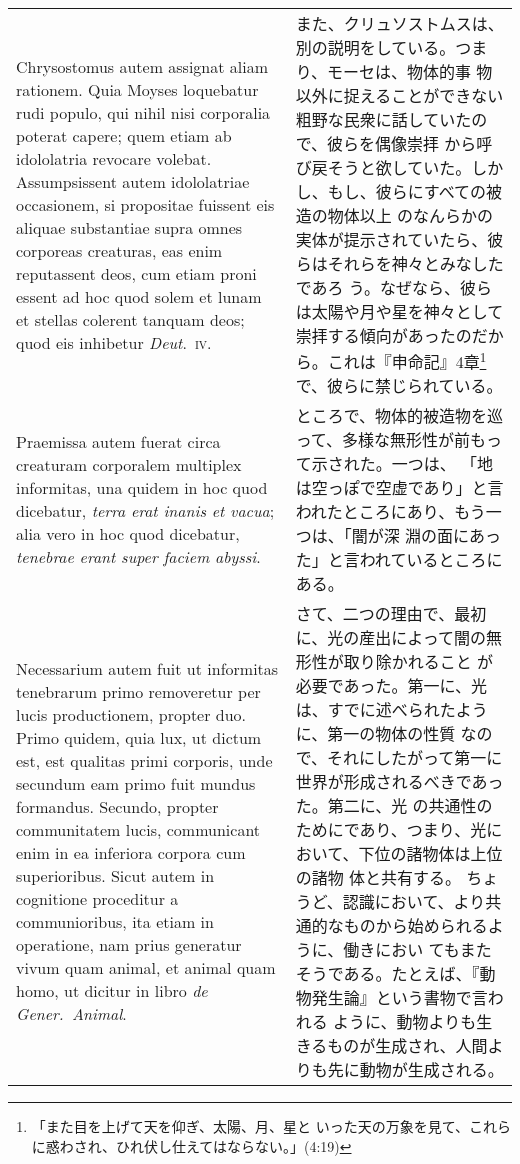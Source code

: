 \documentclass[10pt]{jsarticle} %
\begin{document}
\begin{longtable}{p{21em}p{21em}}
\\


Chrysostomus autem assignat
aliam rationem. Quia Moyses loquebatur rudi populo, qui nihil nisi
corporalia poterat capere; quem etiam ab idololatria revocare
volebat. Assumpsissent autem idololatriae occasionem, si propositae
fuissent eis aliquae substantiae supra omnes corporeas creaturas, eas
enim reputassent deos, cum etiam proni essent ad hoc quod solem et lunam
et stellas colerent tanquam deos; quod eis inhibetur {\itshape Deut}.~{\scshape iv}. 


&


また、クリュソストムスは、別の説明をしている。つまり、モーセは、物体的事
 物以外に捉えることができない粗野な民衆に話していたので、彼らを偶像崇拝
 から呼び戻そうと欲していた。しかし、もし、彼らにすべての被造の物体以上
 のなんらかの実体が提示されていたら、彼らはそれらを神々とみなしたであろ
 う。なぜなら、彼らは太陽や月や星を神々として崇拝する傾向があったのだか
 ら。これは『申命記』4章\footnote{「また目を上げて天を仰ぎ、太陽、月、星と
 いった天の万象を見て、これらに惑わされ、ひれ伏し仕えてはならない。」(4:19)}で、彼らに禁じられている。



\\

Praemissa autem fuerat circa creaturam corporalem multiplex informitas,
una quidem in hoc quod dicebatur, {\itshape terra erat inanis et vacua};
alia vero in hoc quod dicebatur, {\itshape tenebrae erant super faciem
abyssi}. 


&

ところで、物体的被造物を巡って、多様な無形性が前もって示された。一つは、
 「地は空っぽで空虚であり」と言われたところにあり、もう一つは、「闇が深
 淵の面にあった」と言われているところにある。

\\




Necessarium autem fuit ut informitas tenebrarum primo
removeretur per lucis productionem, propter duo. Primo quidem, quia lux,
ut dictum est, est qualitas primi corporis, unde secundum eam primo fuit
mundus formandus. Secundo, propter communitatem lucis, communicant enim
in ea inferiora corpora cum superioribus. Sicut autem in cognitione
proceditur a communioribus, ita etiam in operatione, nam prius generatur
vivum quam animal, et animal quam homo, ut dicitur in libro {\itshape de
Gener.~Animal}.


&


さて、二つの理由で、最初に、光の産出によって闇の無形性が取り除かれること
 が必要であった。第一に、光は、すでに述べられたように、第一の物体の性質
 なので、それにしたがって第一に世界が形成されるべきであった。第二に、光
 の共通性のためにであり、つまり、光において、下位の諸物体は上位の諸物
 体と共有する。
ちょうど、認識において、より共通的なものから始められるように、働きにおい
 てもまたそうである。たとえば、『動物発生論』という書物で言われる
 ように、動物よりも生きるものが生成され、人間よりも先に動物が生成される。


\end{longtable}
\end{document}
